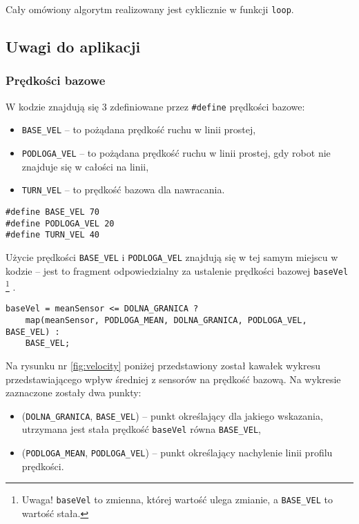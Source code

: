 \documentclass[11pt]{article}
\begin{document}
Cały omówiony algorytm realizowany jest cyklicznie w funkcji \texttt{loop}.

\subsection{Uwagi do aplikacji}

\subsubsection{Prędkości bazowe}
W kodzie znajdują się 3 zdefiniowane przez \texttt{\#define} prędkości bazowe:
\begin{itemize}
\item \texttt{BASE\_VEL} -- to pożądana prędkość ruchu w linii prostej,
\item \texttt{PODLOGA\_VEL} -- to pożądana prędkość ruchu w linii prostej, gdy robot nie znajduje się w całości na linii,
\item \texttt{TURN\_VEL} -- to prędkość bazowa dla nawracania.
\end{itemize}

\begin{lstlisting}[firstnumber = 49]
#define BASE_VEL 70
#define PODLOGA_VEL 20
#define TURN_VEL 40
\end{lstlisting}

Użycie prędkości \texttt{BASE\_VEL} i \texttt{PODLOGA\_VEL} znajdują się w tej samym miejscu w kodzie -- jest to fragment odpowiedzialny za ustalenie prędkości bazowej \texttt{baseVel}%
\footnote%
{Uwaga! \texttt{baseVel} to zmienna, której wartość ulega zmianie, a \texttt{BASE\_VEL} to wartość stała.}%
.
\begin{lstlisting}[firstnumber = 94]
baseVel = meanSensor <= DOLNA_GRANICA ?
	map(meanSensor, PODLOGA_MEAN, DOLNA_GRANICA, PODLOGA_VEL, BASE_VEL) :
	BASE_VEL;
\end{lstlisting}

Na rysunku nr \ref{fig:velocity} poniżej przedstawiony został kawałek wykresu przedstawiającego wpływ średniej z sensorów na prędkość bazową. Na wykresie zaznaczone zostały dwa punkty:
\begin{itemize}
\item (\texttt{DOLNA\_GRANICA}, \texttt{BASE\_VEL}) -- punkt określający dla jakiego wskazania, utrzymana jest stała prędkość \texttt{baseVel} równa \texttt{BASE\_VEL},
\item (\texttt{PODLOGA\_MEAN}, \texttt{PODLOGA\_VEL}) -- punkt określający nachylenie linii profilu prędkości.
\end{itemize}
\end{document}
